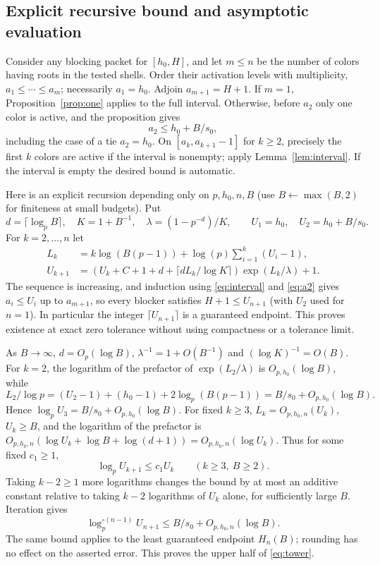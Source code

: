 \documentclass[11pt]{article}
\theoremstyle{remark}\newtheorem{remark}[theorem]{Remark}
\begin{document}
\subsection*{Explicit recursive bound and asymptotic evaluation}
Consider any blocking packet for $[h_0,H]$, and let $m\le n$ be the number of colors having roots in the tested shells. Order their activation levels with multiplicity, $a_1\le\cdots\le a_m$; necessarily $a_1=h_0$. Adjoin $a_{m+1}=H+1$. If $m=1$, Proposition~\ref{prop:one} applies to the full interval. Otherwise, before $a_2$ only one color is active, and the proposition gives
\begin{equation}\label{eq:a2}
 a_2\le h_0+B/s_0,
\end{equation}
including the case of a tie $a_2=h_0$. On $[a_k,a_{k+1}-1]$ for $k\ge2$, precisely the first $k$ colors are active if the interval is nonempty; apply Lemma~\ref{lem:interval}. If the interval is empty the desired bound is automatic.

Here is an explicit recursion depending only on $p,h_0,n,B$ (use $B\gets\max(B,2)$ for finiteness at small budgets). Put
\[
 d=\lceil\log_p B\rceil,\quad K=1+B^{-1},\quad \lambda=(1-p^{-d})/K,
 \qquad U_1=h_0,\quad U_2=h_0+B/s_0.
\]
For $k=2,\ldots,n$ let
\begin{align*}
 L_k&= k\log(B(p-1))+\log(p)\sum_{i=1}^k(U_i-1),\\
 U_{k+1}&=(U_k+C+1+d+\lceil dL_k/\log K\rceil)\exp(L_k/\lambda)+1.
\end{align*}
The sequence is increasing, and induction using \eqref{eq:interval} and \eqref{eq:a2} gives $a_i\le U_i$ up to $a_{m+1}$, so every blocker satisfies $H+1\le U_{n+1}$ (with $U_2$ used for $n=1$). In particular the integer $\lceil U_{n+1}\rceil$ is a guaranteed endpoint. This proves existence at exact zero tolerance without using compactness or a tolerance limit.

As $B\to\infty$, $d=O_p(\log B)$, $\lambda^{-1}=1+O(B^{-1})$ and $(\log K)^{-1}=O(B)$. For $k=2$, the logarithm of the prefactor of $\exp(L_2/\lambda)$ is $O_{p,h_0}(\log B)$, while
\[
 L_2/\log p=(U_2-1)+(h_0-1)+2\log_p(B(p-1))
 =B/s_0+O_{p,h_0}(\log B).
\]
Hence $\log_p U_3=B/s_0+O_{p,h_0}(\log B)$. For fixed $k\ge3$, $L_k=O_{p,h_0,n}(U_k)$, $U_k\ge B$, and the logarithm of the prefactor is $O_{p,h_0,n}(\log U_k+\log B+\log(d+1))=O_{p,h_0,n}(\log U_k)$. Thus for some fixed $c_1\ge1$,
\[
 \log_p U_{k+1}\le c_1 U_k\qquad(k\ge3,\ B\ge2).
\]
Taking $k-2\ge1$ more logarithms changes the bound by at most an additive constant relative to taking $k-2$ logarithms of $U_k$ alone, for sufficiently large $B$. Iteration gives
\[
 \log_p^{\circ(n-1)} U_{n+1}\le B/s_0+O_{p,h_0,n}(\log B).
\]
The same bound applies to the least guaranteed endpoint $H_n(B)$; rounding has no effect on the asserted error. This proves the upper half of \eqref{eq:tower}.
\end{document}

